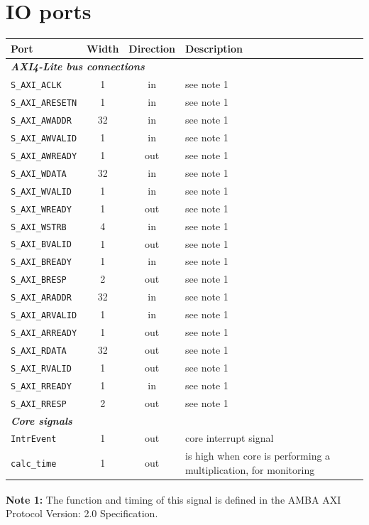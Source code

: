 \section{IO ports}
\begin{tabular}{|l|c|c|l|}
	\hline
	\rowcolor{Gray}
	\textbf{Port} & \textbf{Width} & \textbf{Direction} & \textbf{Description} \\
	\hline
	\multicolumn{4}{|l|}{\textit{\textbf{AXI4-Lite bus connections}}} \\
	\hline
	\verb|S_AXI_ACLK| & 1     & in & see note 1 \\
	\hline
	\verb|S_AXI_ARESETN| & 1     & in & see note 1 \\
	\hline
	\verb|S_AXI_AWADDR| & 32    & in & see note 1 \\
	\hline
	\verb|S_AXI_AWVALID| & 1     & in & see note 1 \\
	\hline
	\verb|S_AXI_AWREADY| & 1     & out & see note 1 \\
	\hline
	\verb|S_AXI_WDATA| & 32     & in & see note 1 \\
	\hline
	\verb|S_AXI_WVALID| & 1     & in & see note 1 \\
	\hline
	\verb|S_AXI_WREADY| & 1     & out & see note 1 \\
	\hline
	\verb|S_AXI_WSTRB| & 4     & in & see note 1 \\
	\hline
	\verb|S_AXI_BVALID| & 1    & out & see note 1 \\
	\hline
	\verb|S_AXI_BREADY| & 1     & in & see note 1 \\
	\hline
	\verb|S_AXI_BRESP| & 2     & out & see note 1 \\
	\hline
	\verb|S_AXI_ARADDR| & 32     & in & see note 1 \\
	\hline
	\verb|S_AXI_ARVALID| & 1     & in & see note 1 \\
	\hline
	\verb|S_AXI_ARREADY| & 1     & out & see note 1 \\
	\hline
	\verb|S_AXI_RDATA| & 32     & out & see note 1 \\
	\hline
	\verb|S_AXI_RVALID| & 1    & out & see note 1 \\
	\hline
	\verb|S_AXI_RREADY| & 1     & in & see note 1 \\
	\hline
	\verb|S_AXI_RRESP| & 2     & out & see note 1 \\
	\hline
	\multicolumn{4}{|l|}{\textit{\textbf{Core signals}}} \\
	\hline
	\verb|IntrEvent| & 1     & out   & core interrupt signal \\
	\hline
	\verb|calc_time| & 1     & out   & is high when core is performing a multiplication, for monitoring \\
	\hline
\end{tabular}%
\newline \newline
\textbf{Note 1:} The function and timing of this signal is defined in the AMBA\textsuperscript{\textregistered} AXI Protocol Version: 2.0 Specification.

